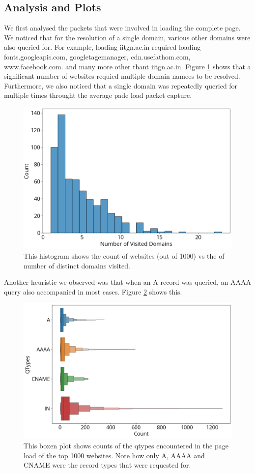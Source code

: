 \documentclass[conference]{IEEEtran}
\begin{document}
\subsection{Analysis and Plots}
We first analysed the packets that were involved in loading the complete page. We noticed that for the resolution of a single domain, various other domains were also queried for. For example, loading iitgn.ac.in required loading fonts.googleapis.com, googletagemanager, cdn.usefathom.com, www.facebook.com. and many more other thant iitgn.ac.in. Figure \ref{fig:n_visited-domains} shows that a significant number of websites requied multiple domain namees to be resolved. Furthermore, we also noticed that a single domain was repeatedly queried for multiple times throught the average pade load packet capture.

\begin{figure}[htbp]
    \centering
    \includegraphics[width=0.9\linewidth]{images/n_visited-domains.png}
    \caption{This histogram shows the count of websites (out of 1000) vs the of number of distinct domains visited.}
    \label{fig:n_visited-domains}
\end{figure}

Another heuristic we observed was that when an A record was queried, an AAAA query also accompanied in most cases. Figure \ref{fig:qtypes} shows this. 

\begin{figure}[htbp]
    \centering
    \includegraphics[width=0.9\linewidth]{images/qtypes.png}
    \caption{This boxen plot shows counts of the qtypes encountered in the page load of the top 1000 websites. Note how only A, AAAA and CNAME were the record types that were requested for.}
    \label{fig:qtypes}
\end{figure}
\end{document}
